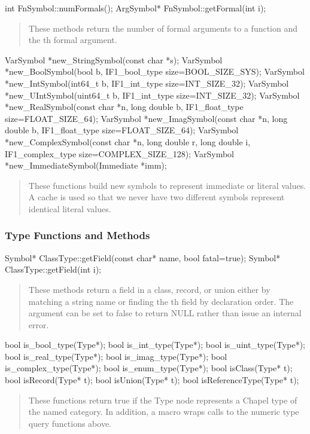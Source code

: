 \documentclass[10pt]{article}
\begin{document}
\begin{clang}
int FnSymbol::numFormals();
ArgSymbol* FnSymbol::getFormal(int i);
\end{clang}
\begin{quote}
These methods return the number of formal arguments to a function and
the th formal argument.
\end{quote}

\begin{clang}
VarSymbol *new_StringSymbol(const char *s);
VarSymbol *new_BoolSymbol(bool b, IF1_bool_type size=BOOL_SIZE_SYS);
VarSymbol *new_IntSymbol(int64_t b, IF1_int_type size=INT_SIZE_32);
VarSymbol *new_UIntSymbol(uint64_t b, IF1_int_type size=INT_SIZE_32);
VarSymbol *new_RealSymbol(const char *n, long double b, IF1_float_type size=FLOAT_SIZE_64);
VarSymbol *new_ImagSymbol(const char *n, long double b, IF1_float_type size=FLOAT_SIZE_64);
VarSymbol *new_ComplexSymbol(const char *n, long double r, long double i,
                             IF1_complex_type size=COMPLEX_SIZE_128);
VarSymbol *new_ImmediateSymbol(Immediate *imm);
\end{clang}
\begin{quote}
These functions build new symbols to represent immediate or literal
values.  A cache is used so that we never have two different symbols
represent identical literal values.
\end{quote}

\subsubsection{Type Functions and Methods}

\begin{clang}
Symbol* ClassType::getField(const char* name, bool fatal=true);
Symbol* ClassType::getField(int i);
\end{clang}
\begin{quote}
These methods return a field in a class, record, or union either by
matching a string name or finding the th field by declaration
order.  The argument  can be set to false to return NULL
rather than issue an internal error.
\end{quote}

\begin{clang}
bool is_bool_type(Type*);
bool is_int_type(Type*);
bool is_uint_type(Type*);
bool is_real_type(Type*);
bool is_imag_type(Type*);
bool is_complex_type(Type*);
bool is_enum_type(Type*);
bool isClass(Type* t);
bool isRecord(Type* t);
bool isUnion(Type* t);
bool isReferenceType(Type* t);
\end{clang}
\begin{quote}
These functions return true if the Type node represents a Chapel type
of the named category.  In addition, a macro 
wraps calls to the numeric type query functions above.
\end{quote}
\end{document}
